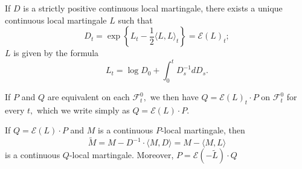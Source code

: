 \begin{proposition}
	If $D$ is a strictly positive continuous local martingale, there exists a unique continuous local martingale $L$ such that \[ D_{t}=\exp \left\{L_{t}-\frac{1}{2}\langle L, L\rangle_{t}\right\}=\mathscr{E}(L)_{t} ;\]
	$ L $ is given by the formula
	\[ L_{t}=\log D_{0}+\int_{0}^{t} D_{s}^{-1} d D_{s}. \]
\end{proposition}
If $P$ and $Q$ are equivalent on each $\mathscr{ F}_{t}^{0},$ we then have $Q=\mathscr{E}(L)_{t} \cdot P$ on $\mathscr{F}_{t}^{0}$ for every $t,$ which we write simply as $Q=\mathscr{E}(L) \cdot P .$
\begin{theorem}
	If $Q=\mathscr{E}(L) \cdot P$ and $M$ is a continuous $P$-local martingale, then
	\[ \widetilde{M}=M-D^{-1} \cdot\langle M, D\rangle=M-\langle M, L\rangle \]
	is a continuous $Q$-local martingale. Moreover, $P=\mathscr{E}(-\widetilde{L})\cdot Q$
\end{theorem}

